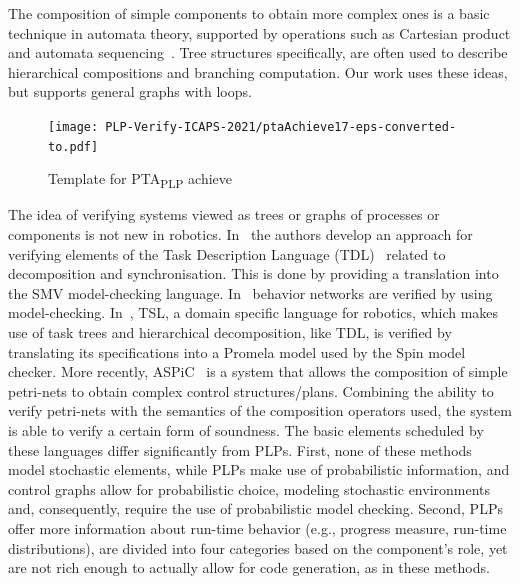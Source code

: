 \documentclass[letterpaper]{article}
\begin{document}
The composition of simple components to obtain more complex ones is a basic technique in automata theory, supported by operations such as Cartesian product and automata sequencing~\citep{automatabook}. Tree structures specifically, are often used to describe hierarchical compositions and branching computation. Our work uses these ideas, but supports general graphs with loops.

\begin{figure}[h]
\centering
\texttt{[image: PLP-Verify-ICAPS-2021/ptaAchieve17-eps-converted-to.pdf]}
\caption{Template for PTA\textsubscript{PLP} achieve}
\label{fig:ptaAchieve}
\end{figure}

The idea of verifying systems viewed as trees or graphs of processes or components is not new in robotics.
In~\citet{SPS00} the authors develop an approach for verifying elements of the Task Description Language (TDL)~\citep{TCA} related to decomposition and synchronisation.
This is done by providing a translation into the SMV model-checking language. In~\citet{AKRB13} behavior networks are verified by using model-checking. In~\citet{vTSL}, TSL, a domain specific language for robotics, which makes use of task trees and hierarchical decomposition, like TDL, is verified by translating its specifications into a Promela model used by the Spin model checker.
More recently, ASPiC~\cite{ASPiC} is a system that allows the composition of simple petri-nets to obtain complex control structures/plans.
Combining the ability to verify petri-nets with the semantics of the composition operators used, the system is able to verify a certain form of soundness.
The basic elements scheduled by these languages differ significantly from PLPs.
First, none of these methods model stochastic elements, while PLPs make use of probabilistic information, and control graphs allow for probabilistic choice, modeling stochastic environments and, consequently, require the use of probabilistic model checking. Second, PLPs offer more information about run-time behavior (e.g., progress measure, run-time distributions), are divided into four categories based on the component's role, yet are not rich enough to actually allow for code generation, as in these methods.
\end{document}
